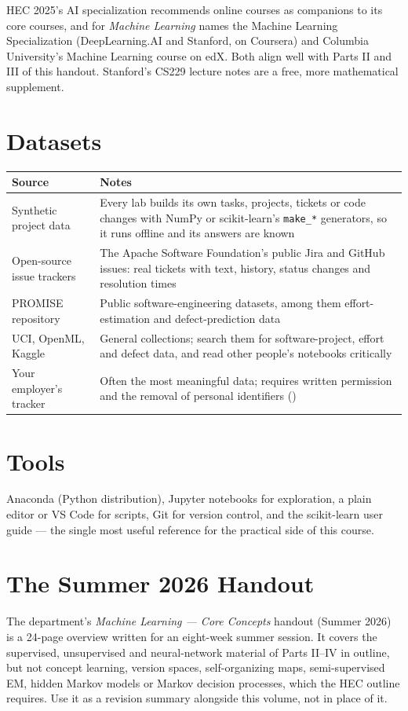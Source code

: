 HEC 2025's AI specialization recommends online courses as companions to its core
courses, and for \emph{Machine Learning} names the Machine Learning Specialization
(DeepLearning.AI and Stanford, on Coursera) and Columbia University's Machine Learning
course on edX. Both align well with Parts II and III of this handout. Stanford's CS229
lecture notes are a free, more mathematical supplement.

\section{Datasets}

\begin{longtable}{@{}L{4.6cm}L{10.4cm}@{}}
\toprule
{}
\textbf{Source} & \textbf{Notes} \\
\midrule
\endhead
Synthetic project data & Every lab builds its own tasks, projects, tickets or code
changes with NumPy or scikit-learn's \texttt{make\_*} generators, so it runs offline
and its answers are known \\
Open-source issue trackers & The Apache Software Foundation's public Jira and GitHub
issues: real tickets with text, history, status changes and resolution times \\
PROMISE repository & Public software-engineering datasets, among them effort-estimation
and defect-prediction data \\
UCI, OpenML, Kaggle & General collections; search them for software-project,
effort and defect data, and read other people's notebooks critically \\
Your employer's tracker & Often the most meaningful data; requires written permission
and the removal of personal identifiers () \\
\bottomrule
\end{longtable}

\section{Tools}

Anaconda (Python distribution), Jupyter notebooks for exploration, a plain editor or
VS Code for scripts, Git for version control, and the scikit-learn user guide --- the
single most useful reference for the practical side of this course.

\section{The Summer 2026 Handout}

The department's \emph{Machine Learning --- Core Concepts} handout (Summer 2026) is a
24-page overview written for an eight-week summer session. It covers the supervised,
unsupervised and neural-network material of Parts II--IV in outline, but not concept
learning, version spaces, self-organizing maps, semi-supervised EM, hidden Markov models
or Markov decision processes, which the HEC outline requires. Use it as a revision
summary alongside this volume, not in place of it.
